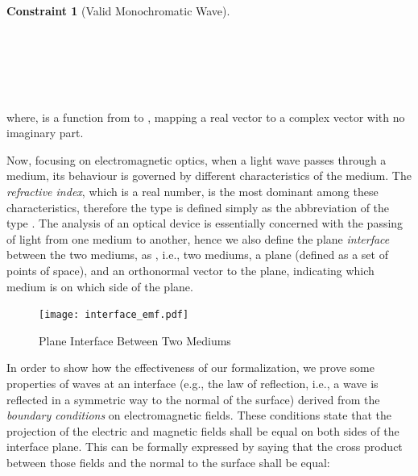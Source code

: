 \documentclass{llncs}
\newtheorem{cons}{Constraint}
\begin{document}
{\begin{cons}[Valid Monochromatic Wave]\ \label{valid_wave} \vspace{.1cm} \\
\\
  \\
   \\
   \\
    \\
\end{cons}

 \noindent where,  is a function from  to , mapping a real vector to a complex vector with no imaginary part.
 
Now, focusing on electromagnetic optics, when a light wave passes through a medium, its behaviour is governed by different characteristics of the medium.
The \emph{refractive index}, which is a real number, is the most dominant among these characteristics,
therefore the type  is defined simply as the abbreviation of the type .
The analysis of an optical device is essentially concerned with the passing of light from one medium to another, hence we also define
the plane \emph{interface} between the two mediums, as ,
i.e., two mediums, a plane (defined as a set of points of space), and an orthonormal vector to the plane,
indicating which medium is on which side of the plane.

\begin{figure}[h]
  \centering  \texttt{[image: interface\_emf.pdf]}\ \\
  \caption{Plane Interface Between Two Mediums}\label{fig_interface}
  \vspace{-.2cm}
\end{figure}


In order to show how the effectiveness of our formalization, we prove some properties of waves at an interface
(e.g., the law of reflection, i.e., a wave is reflected in a symmetric way to the normal of the surface)
derived from the \emph{boundary conditions} on electromagnetic fields.
These conditions state that the projection of the electric and magnetic fields shall be equal on both sides of the interface plane.
This can be formally expressed by saying that the cross product between those fields and the normal to the surface shall be equal:

}
\end{document}
